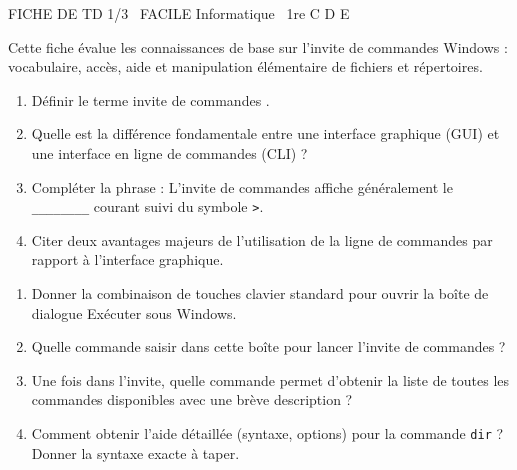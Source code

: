 \documentclass[11pt]{article}
\begin{document}
\begin{tcolorbox}[enhanced,colback=popink,colframe=popink,arc=10pt,boxrule=0pt,left=12pt,right=12pt,top=9pt,bottom=9pt]
{\color{white}\popxbold\small FICHE DE TD 1/3 \textbullet\ FACILE \hfill Informatique \textbullet\ 1re C D E\par}
\end{tcolorbox}
\vspace{4pt}
Cette fiche évalue les connaissances de base sur l'invite de commandes Windows : vocabulaire, accès, aide et manipulation élémentaire de fichiers et répertoires.

\begin{exercice}
\begin{enumerate}
    \item Définir le terme \og invite de commandes \fg.
    \item Quelle est la différence fondamentale entre une interface graphique (GUI) et une interface en ligne de commandes (CLI) ?
    \item Compléter la phrase : L'invite de commandes affiche généralement le \texttt{\_\_\_\_\_\_\_\_} courant suivi du symbole \texttt{>}.
    \item Citer deux avantages majeurs de l'utilisation de la ligne de commandes par rapport à l'interface graphique.
\end{enumerate}
\end{exercice}

\begin{exercice}
\begin{enumerate}
    \item Donner la combinaison de touches clavier standard pour ouvrir la boîte de dialogue \og Exécuter \fg sous Windows.
    \item Quelle commande saisir dans cette boîte pour lancer l'invite de commandes ?
    \item Une fois dans l'invite, quelle commande permet d'obtenir la liste de toutes les commandes disponibles avec une brève description ?
    \item Comment obtenir l'aide détaillée (syntaxe, options) pour la commande \texttt{dir} ? Donner la syntaxe exacte à taper.
\end{enumerate}
\end{exercice}
\end{document}
